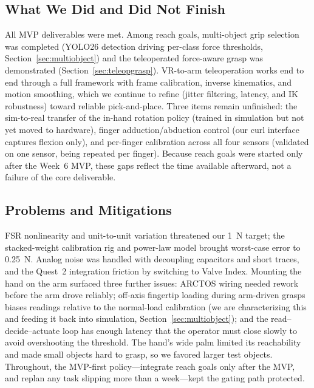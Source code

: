 \documentclass[acmlarge,screen,nonacm]{acmart}
\begin{document}
\subsection{What We Did and Did Not Finish}
All MVP deliverables were met. Among reach goals, multi-object grip selection was
completed (YOLO26 detection driving per-class force thresholds,
Section~\ref{sec:multiobject}) and the teleoperated force-aware grasp was
demonstrated (Section~\ref{sec:teleopgrasp}). VR-to-arm teleoperation works end
to end through a full framework with frame calibration, inverse kinematics, and
motion smoothing, which we continue to refine (jitter filtering, latency, and IK
robustness) toward reliable pick-and-place. Three items remain unfinished: the sim-to-real transfer of the
in-hand rotation policy (trained in simulation but not yet moved to hardware),
finger adduction/abduction control (our curl interface captures flexion only),
and per-finger calibration across all four sensors (validated on one sensor,
being repeated per finger). Because reach goals were started only after the
Week~6 MVP, these gaps reflect the time available afterward, not a failure of the
core deliverable.

\subsection{Problems and Mitigations}
FSR nonlinearity and unit-to-unit variation threatened our 1~N target; the
stacked-weight calibration rig and power-law model brought worst-case error to
0.25~N. Analog noise was handled with decoupling capacitors and short traces, and
the Quest~2 integration friction by switching to Valve Index. Mounting the hand
on the arm surfaced three further issues: ARCTOS wiring needed rework before the
arm drove reliably; off-axis fingertip loading during arm-driven grasps biases
readings relative to the normal-load calibration (we are characterizing this and
feeding it back into simulation, Section~\ref{sec:multiobject}); and the
read--decide--actuate loop has enough latency that the operator must close slowly
to avoid overshooting the threshold. The hand's wide palm limited its
reachability and made small objects hard to grasp, so we favored larger test
objects. Throughout, the MVP-first policy---integrate reach goals
only after the MVP, and replan any task slipping more than a week---kept the
gating path protected.

\end{document}
